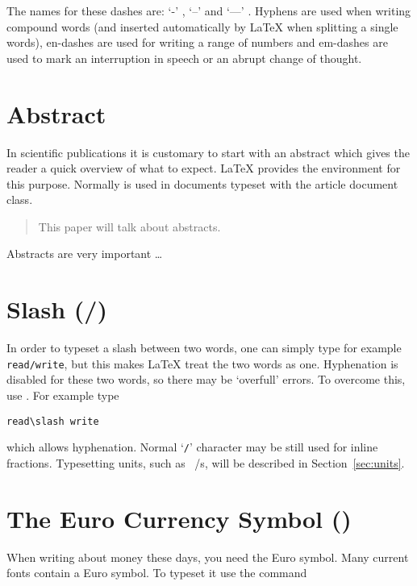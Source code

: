 The names for these dashes are: `-' \index{-}, `--'
\index{--} and `---' \index{---}. Hyphens are used when
writing compound words (and inserted automatically by \LaTeX{} when splitting a
single words), en-dashes are used for writing a range of numbers and em-dashes
are used to mark an interruption in speech or an abrupt change of thought.

\section{Abstract}

In scientific publications it is customary to start with an abstract which
gives the reader a quick overview of what to expect. \LaTeX{} provides the
 environment for this purpose. Normally  is used
in documents typeset with the article document class.

\begin{example}[standalone, paperheight=3.5cm]
\begin{abstract}
  This paper will talk about abstracts.
\end{abstract}

Abstracts are very important \ldots
\end{example}

\section{Slash (/)}

In order to typeset a slash between two words, one can simply type for example
\texttt{read/write}, but this makes \LaTeX{} treat the two words as one.
Hyphenation is disabled for these two words, so there may be
\enquote*{overfull} errors.  To overcome this, use .  For example
type
\begin{code}
  \verb|read\slash write|
\end{code}
which allows hyphenation.  Normal
\enquote*{\texttt{/}} character may be still used for inline fractions.
Typesetting units, such as \unit[per-mode = symbol]{\mebi\byte\per\s}, will be
described in Section~\ref{sec:units}.

\section{The Euro Currency Symbol \texorpdfstring{(\officialeuro)}{}}

When writing about money these days, you need the Euro symbol. Many current
fonts contain a Euro symbol. To typeset it use the command
\begin{lscommand}
\end{lscommand}


